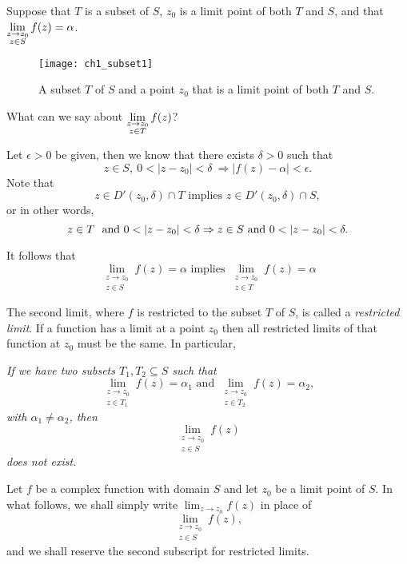 \begin{question}
Suppose that $T$ is a subset of $S$, $z_0$ is a limit point of both $T$ and $S$, and that $\displaystyle \lim_{\substack{z \to z_0 \\ z \in S}} f(z) = \alpha$. 
\begin{SCfigure}[2][h]
\texttt{[image: ch1\_subset1]}
\caption{A subset $T$ of $S$ and a point $z_0$ that is a limit point of both $T$ and $S$.}
\end{SCfigure}
What can we say about $\displaystyle \lim_{\substack{z \to z_0 \\ z \in T}} f(z)$?
\end{question}
\begin{answer}
Let $\epsilon >0$ be given, then we know that there exists $\delta >0$ such that
\[
z \in S,\ 0<|z-z_0|<\delta \ \Rightarrow |f(z)-\alpha| < \epsilon.
\]
Note that
\[
 z \in D'(z_0, \delta) \cap T \text{ implies } z \in D' (z_0,\delta) \cap S,
\]
or in other words,
\[
z \in T\ \text{ and } 0 < \left| z -z_0 \right| < \delta \Rightarrow z \in S \text{ and } 0 < \left| z-z_0 \right| < \delta.
\]

It follows that
\[
 \lim_{\substack{z \to z_0 \\ z \in S}} f(z) = \alpha \text{ implies }  \lim_{\substack{z \to z_0 \\ z \in T}} f(z) = \alpha
\]
\end{answer}
The second limit, where $f$ is restricted to the subset $T$ of $S$, is called a \emph{restricted limit}.   If a function has a limit at a point $z_0$ then all restricted limits of that function at $z_0$ must be the same.   In particular, 

\emph{If we have two subsets $T_1,T_2 \subseteq S$ such that 
\[
 \lim_{\substack{z \to z_0 \\ z \in T_1}} f(z) = \alpha_1 \text{ and } \lim_{\substack{z \to z_0 \\ z \in T_2}} f(z) = \alpha_2,
\]
with $\alpha_1 \neq \alpha_2$, then
\[
\lim_{\substack{z \to z_0 \\ z \in S}} f(z)
\]
does not exist.
}




Let $f$ be a complex function with domain $S$ and let $z_0$ be a limit point of $S$.  In what follows, we shall simply write $\displaystyle \lim_{z \to z_0} f(z)$ in place of \[
\lim_{\substack{z \to z_0 \\ z \in S}} f(z),
\]
and we shall reserve the second subscript for restricted limits.



